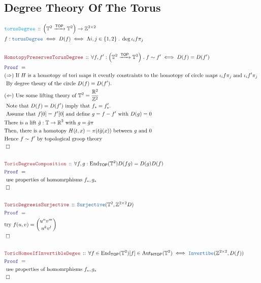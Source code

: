 \documentclass[12pt]{scrartcl}
\newcommand{\TYPE}[1]{\textcolor{NavyBlue}{\mathtt{#1}}}
\newcommand{\FUNC}[1]{\textcolor{Cerulean}{\mathtt{#1}}}
\newcommand{\LOGIC}[1]{\textcolor{Blue}{\mathtt{#1}}}
\newcommand{\THM}[1]{\textcolor{Maroon}{\mathtt{#1}}}
\renewcommand{\.}{\; . \;}
\newcommand{\Theorem}[2]{& \THM{#1} \, :: \, #2 \\ & \Proof = \\ }
\newcommand{\DefineNamedType}[4]{& #1 : \TYPE{#2} \iff #3 \iff #4 \\}
\newcommand{\DeclareFunc}[2]{& \FUNC{#1} \, :: \, #2 \\}
\newcommand{\Page}[1]{ \begin{align*} #1 \end{align*}   }
\newcommand{\Imply}{\Rightarrow}
\newcommand{\Int}{\mathbb{Z} }
\newcommand{\Reals}{\mathbb{R} }
\newcommand{\End}{\mathrm{End}}
\newcommand{\Aut}{\mathrm{Aut}}
\newcommand{\Arrow}{\xrightarrow}
\newcommand{\QED}{\; \square}
\newcommand{\EndProof}{& \QED \\}
\newcommand{\Proof}{\LOGIC{Proof} \; }
\newcommand{\TOP}{\mathsf{TOP}}
\newcommand{\HTOP}{\mathsf{HTOP}}
\begin{document}
\subsection{Degree Theory Of The Torus}
\Page{
	\DeclareFunc{torusDegree}
	{
		\Big(\mathbb{T}^2 \Arrow{\TOP} \mathbb{T}^2 \Big) \to \Int^{2 \times 2}
	}
	\DefineNamedType{f}{torusDegree}{  D(f)  }
	{
		\Lambda i,j \in\{1,2\} \.  \deg \iota_i f \pi_j
	}
	\\
	\Theorem{HomotopyPreservesTorusDegree}
	{
		\forall f,f' : \Big( \mathbb{T}^2 \Arrow{\TOP} \mathbb{T}^2 \Big) \.
		f \sim f' \iff D(f) = D(f')
	}
	& (\Imply) \text{  If $H$ is a homotopy of tori maps it evently constraints to the homotopy of circle maps 
		$ \iota_i f \pi_j $ and $\iota_i f' \pi_j$ } \\
	& \text{ By degree theory of the circle $D(f) = D(f')$.  } \\
	& (\Leftarrow) \text{ Use some lifting theory of $\mathbb{T}^2 = \frac{\Reals^2}{\Int^2}$  } \\
	& \text{ Note that $D(f) = D(f')$ imply that $f_* = f'_*$.} \\
	& \text{ Assume that $f[0] = f'[0]$ and define $g = f - f'$ with $D(g) = 0$ } \\
	& \text{There is a lift $\tilde{g} : \mathbb{T} \to \Reals^2$ with $g = \tilde g \pi $ } \\
	& \text{Then, there is a homotopy $H(t,x) = \pi( t \tilde g(x) )$ between $g$ and $0$} \\
	& \text{Hence $f \sim f'$ by topological groop theory}  \\
	\EndProof
	\\
	\Theorem{ToricDegreeComposition}
	{
		\forall f,g :  \End_{\TOP}(\mathbb{T}^2)
		D(fg) = D(g)D(f)
	}
	&\text{ use properties of homomrphisms $f_*,g_*$}\\
	\EndProof
	\\
	\Theorem{ToricDegreeisSurjective}
	{
		\TYPE{Surjective}(\mathbb{T}^2,\Int^{2\times 2}D)
	}
	&\text{try $f(u,v) = \binom{u^n v^m}{u^k v^l}$} \\
	\EndProof
	\\
	\Theorem{ToricHomeeIfInvertibleDegee}
	{
		\forall f \in  \End_{\TOP}(\mathbb{T}^2)
		[f] \in \Aut_{\HTOP}(\mathbb{T}^2)
		\iff
		\TYPE{Invertibe}(\Int^{2 \times 2},D(f))
	}
	&\text{ use properties of homomrphisms $f_*,g_*$}\\
	\EndProof
}
\newpage
\end{document}
